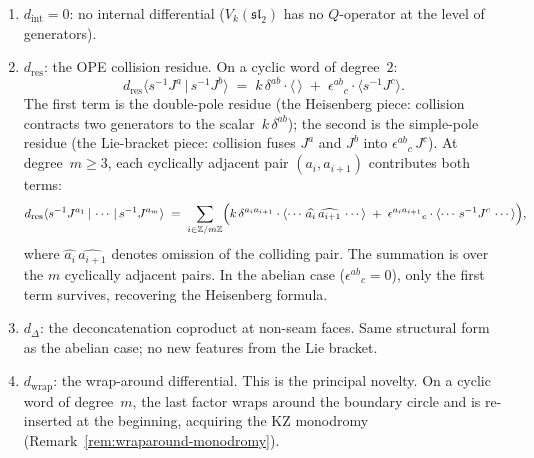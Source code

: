\begin{computation}
\begin{enumerate}[label=\textup{(\alph*)}]
\item $d_{\mathrm{int}} = 0$: no internal differential
 ($V_k(\mathfrak{sl}_2)$ has no $Q$-operator at the
 level of generators).

\item $d_{\mathrm{res}}$: the OPE collision residue.
 On a cyclic word of degree~$2$:
 \begin{equation}\label{eq:sl2-ann-dres-2}
 d_{\mathrm{res}}
 \langle s^{-1}J^a\,|\,s^{-1}J^b\rangle
 \;=\;
 k\,\delta^{ab}\cdot\langle\,\rangle
 \;+\;
 \epsilon^{ab}{}_c\cdot
 \langle s^{-1}J^c\rangle.
 \end{equation}
 The first term is the double-pole residue (the
 Heisenberg piece: collision contracts two generators
 to the scalar~$k\,\delta^{ab}$); the second is the
 simple-pole residue (the Lie-bracket piece: collision
 fuses $J^a$ and $J^b$ into $\epsilon^{ab}{}_c\, J^c$).
 At degree~$m \ge 3$, each cyclically adjacent pair
 $(a_i, a_{i+1})$ contributes both terms:
 \begin{equation}\label{eq:sl2-ann-dres-m}
 d_{\mathrm{res}}
 \langle s^{-1}J^{a_1}\,|\,\cdots\,|\,s^{-1}J^{a_m}\rangle
 \;=\;
 \sum_{i \in \mathbb{Z}/m\mathbb{Z}}
 \Bigl(
 k\,\delta^{a_i a_{i+1}}\cdot
 \langle\cdots\,
 \widehat{a_i}\,\widehat{a_{i+1}}
 \,\cdots\rangle
 \;+\;
 \epsilon^{a_i a_{i+1}}{}_c\cdot
 \langle\cdots\,
 s^{-1}J^c\,\cdots\rangle
 \Bigr),
 \end{equation}
 where $\widehat{a_i}\,\widehat{a_{i+1}}$ denotes
 omission of the colliding pair. The summation
 is over the $m$ cyclically adjacent pairs.
 In the abelian case ($\epsilon^{ab}{}_c = 0$), only the
 first term survives, recovering the Heisenberg formula.

\item $d_\Delta$: the deconcatenation coproduct at
 non-seam faces. Same structural form as the
 abelian case; no new features from the Lie bracket.

\item $d_{\mathrm{wrap}}$: the wrap-around differential.
 This is the principal novelty. On a cyclic word
 of degree~$m$, the last factor wraps around the
 boundary circle and is re-inserted at the beginning,
 acquiring the KZ monodromy
 (Remark~\ref{rem:wraparound-monodromy}).


\end{enumerate}
\end{computation}
